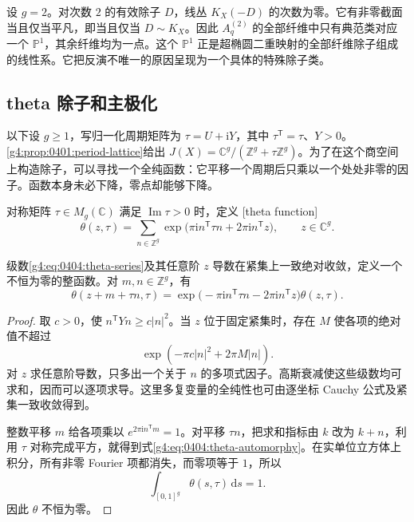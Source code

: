 \begin{example}
	\label{g4:exm:0404:genus-two-fiber}
	设 \(g=2\)。对次数 \(2\) 的有效除子 \(D\)，线丛 \(K_X(-D)\) 的次数为零。它有非零截面当且仅当平凡，即当且仅当 \(D\sim K_X\)。因此 \(A_q^{(2)}\) 的全部纤维中只有典范类对应一个 \(\mathbb P^1\)，其余纤维均为一点。这个 \(\mathbb P^1\) 正是超椭圆二重映射的全部纤维除子组成的线性系。它把反演不唯一的原因呈现为一个具体的特殊除子类。
\end{example}

\subsection{theta 除子和主极化}
\label{g4:subsec:0404:03}

以下设 \(g\ge1\)，写归一化周期矩阵为 \(\tau=U+\mathrm{i}Y\)，其中 \(\tau^{\mathsf T}=\tau\)、\(Y>0\)。\cref{g4:prop:0401:period-lattice}给出 \(J(X)=\mathbb C^g/(\mathbb Z^g+\tau\mathbb Z^g)\)。为了在这个商空间上构造除子，可以寻找一个全纯函数：它平移一个周期后只乘以一个处处非零的因子。函数本身未必下降，零点却能够下降。

\begin{definition}
	\label{g4:def:0404:theta}
	对称矩阵 \(\tau\in M_g(\mathbb C)\) 满足 \(\operatorname{Im}\tau>0\) 时，定义 [theta function]
	\begin{equation}
		\label{g4:eq:0404:theta-series}
		\theta(z,\tau)=\sum_{n\in\mathbb Z^g}
		\exp\bigl(\pi\mathrm{i}n^{\mathsf T}\tau n+2\pi\mathrm{i}n^{\mathsf T}z\bigr),
		\qquad z\in\mathbb C^g.
	\end{equation}
\end{definition}

\begin{proposition}
	\label{g4:prop:0404:theta-automorphy}
	级数\eqref{g4:eq:0404:theta-series}及其任意阶 \(z\) 导数在紧集上一致绝对收敛，定义一个不恒为零的整函数。对 \(m,n\in\mathbb Z^g\)，有
	\begin{equation}
		\label{g4:eq:0404:theta-automorphy}
		\theta(z+m+\tau n,\tau)
		=\exp\bigl(-\pi\mathrm{i}n^{\mathsf T}\tau n-2\pi\mathrm{i}n^{\mathsf T}z\bigr)\theta(z,\tau).
	\end{equation}
\end{proposition}
\begin{proof}
	取 \(c>0\)，使 \(n^{\mathsf T}Yn\ge c|n|^2\)。当 \(z\) 位于固定紧集时，存在 \(M\) 使各项的绝对值不超过
	\[
		\exp(-\pi c|n|^2+2\pi M|n|).
	\]
	对 \(z\) 求任意阶导数，只多出一个关于 \(n\) 的多项式因子。高斯衰减使这些级数均可求和，因而可以逐项求导。这里多复变量的全纯性也可由逐坐标 Cauchy 公式及紧集一致收敛得到。

	整数平移 \(m\) 给各项乘以 \(e^{2\pi\mathrm{i}n^{\mathsf T}m}=1\)。对平移 \(\tau n\)，把求和指标由 \(k\) 改为 \(k+n\)，利用 \(\tau\) 对称完成平方，就得到式\eqref{g4:eq:0404:theta-automorphy}。在实单位立方体上积分，所有非零 Fourier 项都消失，而零项等于 \(1\)，所以
	\[
		\int_{[0,1]^g}\theta(s,\tau)\,\mathrm{d}s=1.
	\]
	因此 \(\theta\) 不恒为零。
\end{proof}


